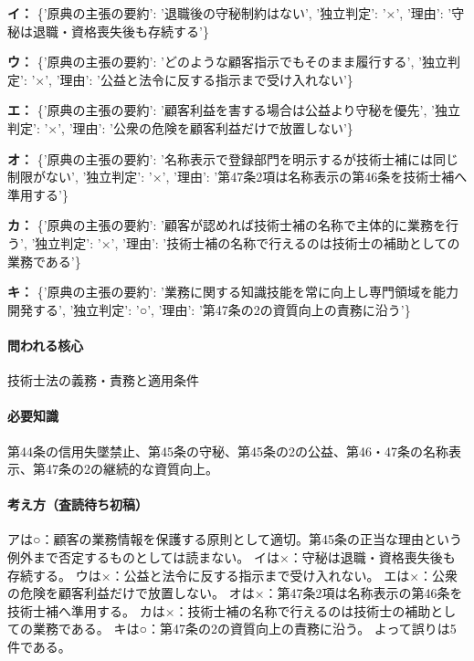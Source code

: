 \noindent\textbf{イ：} \{'原典の主張の要約': '退職後の守秘制約はない', '独立判定': '×', '理由': '守秘は退職・資格喪失後も存続する'\}\par

\noindent\textbf{ウ：} \{'原典の主張の要約': 'どのような顧客指示でもそのまま履行する', '独立判定': '×', '理由': '公益と法令に反する指示まで受け入れない'\}\par

\noindent\textbf{エ：} \{'原典の主張の要約': '顧客利益を害する場合は公益より守秘を優先', '独立判定': '×', '理由': '公衆の危険を顧客利益だけで放置しない'\}\par

\noindent\textbf{オ：} \{'原典の主張の要約': '名称表示で登録部門を明示するが技術士補には同じ制限がない', '独立判定': '×', '理由': '第47条2項は名称表示の第46条を技術士補へ準用する'\}\par

\noindent\textbf{カ：} \{'原典の主張の要約': '顧客が認めれば技術士補の名称で主体的に業務を行う', '独立判定': '×', '理由': '技術士補の名称で行えるのは技術士の補助としての業務である'\}\par

\noindent\textbf{キ：} \{'原典の主張の要約': '業務に関する知識技能を常に向上し専門領域を能力開発する', '独立判定': '○', '理由': '第47条の2の資質向上の責務に沿う'\}\par

\paragraph{問われる核心} 技術士法の義務・責務と適用条件

\paragraph{必要知識} 第44条の信用失墜禁止、第45条の守秘、第45条の2の公益、第46・47条の名称表示、第47条の2の継続的な資質向上。

\paragraph{考え方（査読待ち初稿）} アは○：顧客の業務情報を保護する原則として適切。第45条の正当な理由という例外まで否定するものとしては読まない。 イは×：守秘は退職・資格喪失後も存続する。 ウは×：公益と法令に反する指示まで受け入れない。 エは×：公衆の危険を顧客利益だけで放置しない。 オは×：第47条2項は名称表示の第46条を技術士補へ準用する。 カは×：技術士補の名称で行えるのは技術士の補助としての業務である。 キは○：第47条の2の資質向上の責務に沿う。 よって誤りは5件である。

